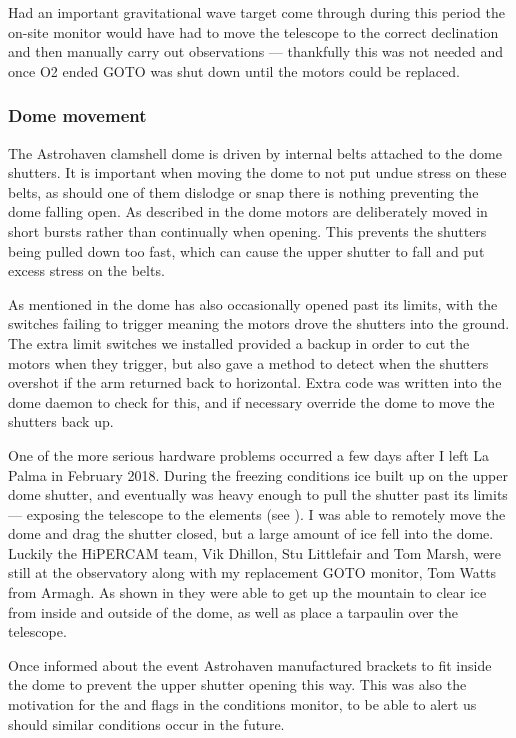 \begin{colsection}
\begin{colsection}
Had an important gravitational wave target come through during this period the on-site monitor would have had to move the telescope to the correct declination and then manually carry out observations --- thankfully this was not needed and once O2 ended GOTO was shut down until the motors could be replaced.

\subsubsection{Dome movement}

The Astrohaven clamshell dome is driven by internal belts attached to the dome shutters. It is important when moving the dome to not put undue stress on these belts, as should one of them dislodge or snap there is nothing preventing the dome falling open. As described in  the dome motors are deliberately moved in short bursts rather than continually when opening. This prevents the shutters being pulled down too fast, which can cause the upper shutter to fall and put excess stress on the belts.

As mentioned in  the dome has also occasionally opened past its limits, with the switches failing to trigger meaning the motors drove the shutters into the ground. The extra limit switches we installed provided a backup in order to cut the motors when they trigger, but also gave a method to detect when the shutters overshot if the arm returned back to horizontal. Extra code was written into the dome daemon to check for this, and if necessary override the dome to move the shutters back up.

One of the more serious hardware problems occurred a few days after I left La Palma in February 2018. During the freezing conditions ice built up on the upper dome shutter, and eventually was heavy enough to pull the shutter past its limits --- exposing the telescope to the elements (see ). I was able to remotely move the dome and drag the shutter closed, but a large amount of ice fell into the dome. Luckily the HiPERCAM team, Vik Dhillon, Stu Littlefair and Tom Marsh, were still at the observatory along with my replacement GOTO monitor, Tom Watts from Armagh. As shown in  they were able to get up the mountain to clear ice from inside and outside of the dome, as well as place a tarpaulin over the telescope.

Once informed about the event Astrohaven manufactured brackets to fit inside the dome to prevent the upper shutter opening this way. This was also the motivation for the  and  flags in the conditions monitor, to be able to alert us should similar conditions occur in the future.


\end{colsection}
\end{colsection}
